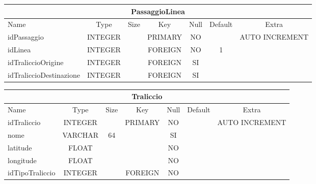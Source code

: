 \begin{center}
    \begin{tabular}{ |l|c|c|c|c|c|c| } 
        \hline
        \multicolumn{7}{|c|}{PassaggioLinea} \\
        \hline
            Name                    & Type     & Size   & Key       & Null  & Default   & Extra \\
        \hline
            idPassaggio             & INTEGER  &        & PRIMARY   & NO    &           & AUTO INCREMENT \\
            idLinea                 & INTEGER  &        & FOREIGN   & NO    & 1         & \\
            idTraliccioOrigine      & INTEGER  &        & FOREIGN   & SI    &           & \\
            idTraliccioDestinazione & INTEGER  &        & FOREIGN   & SI    &           & \\
        \hline
    \end{tabular}
\end{center}

\begin{center}
    \begin{tabular}{ |l|c|c|c|c|c|c| } 
        \hline
        \multicolumn{7}{|c|}{Traliccio} \\
        \hline
            Name             & Type     & Size  & Key       & Null  & Default   & Extra \\
        \hline
            idTraliccio      & INTEGER  &       & PRIMARY   & NO    &           & AUTO INCREMENT \\
            nome             & VARCHAR  & 64    &           & SI    &           & \\
            latitude         & FLOAT    &       &           & NO    &           & \\
            longitude        & FLOAT    &       &           & NO    &           & \\
            idTipoTraliccio  & INTEGER  &       & FOREIGN   & NO    &           & \\
        \hline
    \end{tabular}
\end{center}

